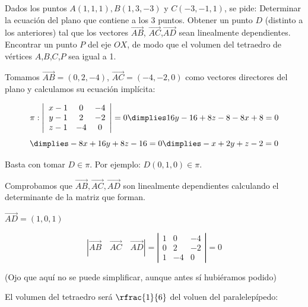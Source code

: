 \begin{problem}[Junio 2019]

Dados los puntos $A(1,1,1), B(1,3,-3)$ y $C(-3,-1,1)$, se pide:
\ppart Determinar la ecuación del plano que contiene a los 3 puntos.
\ppart Obtener un punto $D$ (distinto a los anteriores) tal que los vectores $\vec{AB}$, $\vec{AC}$,$\vec{AD}$ sean linealmente dependientes.
\ppart Encontrar un punto $P$ del eje $OX$, de modo que el volumen del tetraedro de vértices $A$,$B$,$C$,$P$ sea igual a 1.

\solution

\spart 

Tomamos $\vec{AB} = (0,2,-4)$, $\vec{AC} = (-4,-2,0)$ como vectores directores del plano y calculamos su ecuación implícita:

\[
\pi: \left|\begin{array}{ccc}
x - 1 & 0 & -4\\
y - 1 & 2 & -2\\
z - 1 & -4& 0
\end{array}\right| = 0 \dimplies 16y-16 + 8z-8-8x+8 = 0\]
\[\dimplies -8x + 16y + 8z -16 = 0 \dimplies -x+2y+z-2=0
\]

\spart Basta con tomar $D\in\pi$. Por ejemplo: $D(0,1,0)\in\pi$.

Comprobamos que $\vec{AB},\vec{AC},\vec{AD}$ son linealmente dependientes calculando el determinante de la matriz que forman.

$\vec{AD} = (1,0,1)$

\[
|\vec{AB}\quad\vec{AC}\quad\vec{AD}| = 
\left|\begin{array}{ccc}
1 & 0 & -4\\
0 & 2 & -2\\
1 & -4& 0
\end{array}\right| = 0
\]

\spart 

(Ojo que aquí no se puede simplificar, aunque antes sí hubiéramos podido)

El volumen del tetraedro será $\rfrac{1}{6}$ del voluen del paralelepípedo:


\end{problem}
